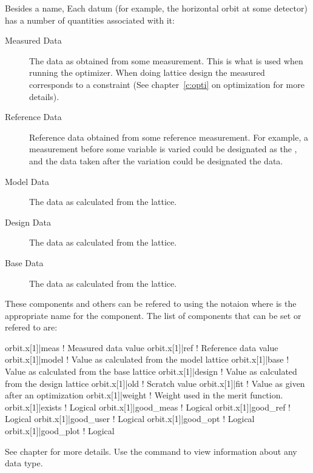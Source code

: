 Besides a name, Each datum (for example, the horizontal orbit at some
detector) has a number of quantities associated with it:
  \vspace*{-3ex}
  \begin{description}
  \item[Measured Data] \Newline 
The data as obtained from some measurement. This is what is used when
running the optimizer.  When doing lattice design the measured
 corresponds to a constraint (See chapter~\ref{c:opti} on
optimization for more details).
  \item[Reference Data] \Newline
Reference data obtained from some reference measurement. For example,
a measurement before some variable is varied could be designated as
the , and the data taken after the variation could be 
designated the  data.
  \item[Model Data] \Newline
The data as calculated from the  lattice.
  \item[Design Data] \Newline
The data as calculated from the  lattice.
  \item[Base Data] \Newline
The data as calculated from the  lattice.
  \end{description}
These components and others can be refered to using the notaion  where
 is the appropriate name for the component. The list of
components that can be set or refered to are:
\begin{example}
  orbit.x[1]|meas      ! Measured data value
  orbit.x[1]|ref       ! Reference data value
  orbit.x[1]|model     ! Value as calculated from the model lattice
  orbit.x[1]|base      ! Value as calculated from the base lattice
  orbit.x[1]|design    ! Value as calculated from the design lattice
  orbit.x[1]|old       ! Scratch value
  orbit.x[1]|fit       ! Value as given after an optimization
  orbit.x[1]|weight    ! Weight used in the merit function.
  orbit.x[1]|exists    ! Logical
  orbit.x[1]|good_meas ! Logical
  orbit.x[1]|good_ref  ! Logical
  orbit.x[1]|good_user ! Logical
  orbit.x[1]|good_opt  ! Logical
  orbit.x[1]|good_plot ! Logical
\end{example}

See chapter  for more details.  Use the  command to view information about any data type. 



\vfill
\break

